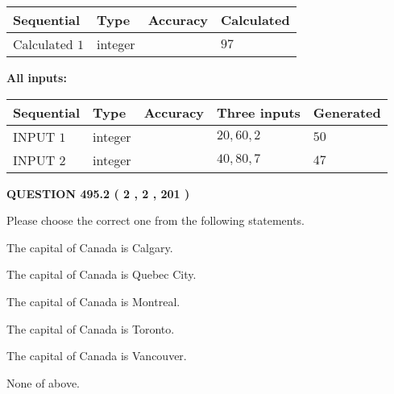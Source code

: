 \documentclass[12pt]{article}
\begin{document}
   
   
   
\noindent{}
   
   
  
  
\noindent\begin{tabular}{|l|l|l|l|}
\hline
 Sequential & Type & Accuracy & Calculated \\ 
\hline
 
 
  Calculated $  1 $ & integer &  & 
  $ 97 $ 
 \\  \hline  
 \end{tabular}
   
   
   
   
\noindent\vspace{0.1in}\hspace{-0.08in} {\textbf{\Large{All inputs: }}}
   
   
  
  
\noindent\begin{tabular}{|l|l|l|l|l|}
\hline
 Sequential & Type & Accuracy & Three inputs & Generated \\ 
\hline
 
 
  INPUT $  1 $ & integer &  & $
 20
 , 
 60
 , 
 2
 $ & $ 50 $ 
 \\  \hline  
 
 
  INPUT $  2 $ & integer &  & $
 40
 , 
 80
 , 
 7
 $ & $ 47 $ 
 \\  \hline  
 \end{tabular}
   
   
  
\vspace{0.2in}
  
{\textbf{\Large{QUESTION
495.2 
 ( 2 , 2 , 201 )
}}}
  
  
Please choose the correct one from the following statements.
 
 
The capital of Canada is Calgary.
 
 
The capital of Canada is Quebec City.
 
 
The capital of Canada is Montreal.
 
 
The capital of Canada is Toronto.
 
 
The capital of Canada is Vancouver.
 
 
 None of above.
 
 
\noindent{}
 
\end{document}
